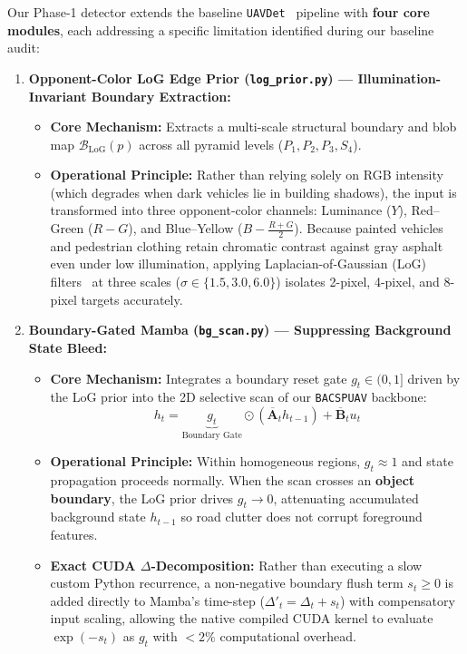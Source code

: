 \documentclass[11pt,a4paper]{article}
\begin{document}
Our Phase-1 detector extends the baseline \texttt{UAVDet}~\cite{yang2026uavdet} pipeline with \textbf{four core modules}, each addressing a specific limitation identified during our baseline audit:

\begin{enumerate}[leftmargin=1.6em]
    \item \textbf{Opponent-Color LoG Edge Prior (\texttt{log\_prior.py}) --- Illumination-Invariant Boundary Extraction:}
    \begin{itemize}[leftmargin=1.2em]
        \item \textbf{Core Mechanism:} Extracts a multi-scale structural boundary and blob map $\mathcal{B}_{\text{LoG}}(p)$ across all pyramid levels ($P_1, P_2, P_3, S_4$).
        \item \textbf{Operational Principle:} Rather than relying solely on RGB intensity (which degrades when dark vehicles lie in building shadows), the input is transformed into three opponent-color channels: Luminance ($Y$), Red--Green ($R-G$), and Blue--Yellow ($B-\frac{R+G}{2}$). Because painted vehicles and pedestrian clothing retain chromatic contrast against gray asphalt even under low illumination, applying Laplacian-of-Gaussian (LoG) filters~\cite{lindeberg1994scalespace} at three scales ($\sigma \in \{1.5, 3.0, 6.0\}$) isolates 2-pixel, 4-pixel, and 8-pixel targets accurately.
    \end{itemize}

    \item \textbf{Boundary-Gated Mamba (\texttt{bg\_scan.py}) --- Suppressing Background State Bleed:}
    \begin{itemize}[leftmargin=1.2em]
        \item \textbf{Core Mechanism:} Integrates a boundary reset gate $g_t \in (0, 1]$ driven by the LoG prior into the 2D selective scan of our \texttt{BACSPUAV} backbone:
        \begin{equation}
            h_t = \underbrace{g_t}_{\text{Boundary Gate}} \odot \left(\overline{\mathbf{A}}_t h_{t-1}\right) + \overline{\mathbf{B}}_t u_t
            \label{eq:bg_mamba}
        \end{equation}
        \item \textbf{Operational Principle:} Within homogeneous regions, $g_t \approx 1$ and state propagation proceeds normally. When the scan crosses an \textbf{object boundary}, the LoG prior drives $g_t \rightarrow 0$, attenuating accumulated background state $h_{t-1}$ so road clutter does not corrupt foreground features.
        \item \textbf{Exact CUDA $\Delta$-Decomposition:} Rather than executing a slow custom Python recurrence, a non-negative boundary flush term $s_t \ge 0$ is added directly to Mamba's time-step ($\Delta'_t = \Delta_t + s_t$) with compensatory input scaling, allowing the native compiled CUDA kernel to evaluate $\exp(-s_t)$ as $g_t$ with $<2\%$ computational overhead.
    \end{itemize}


\end{enumerate}
\end{document}
